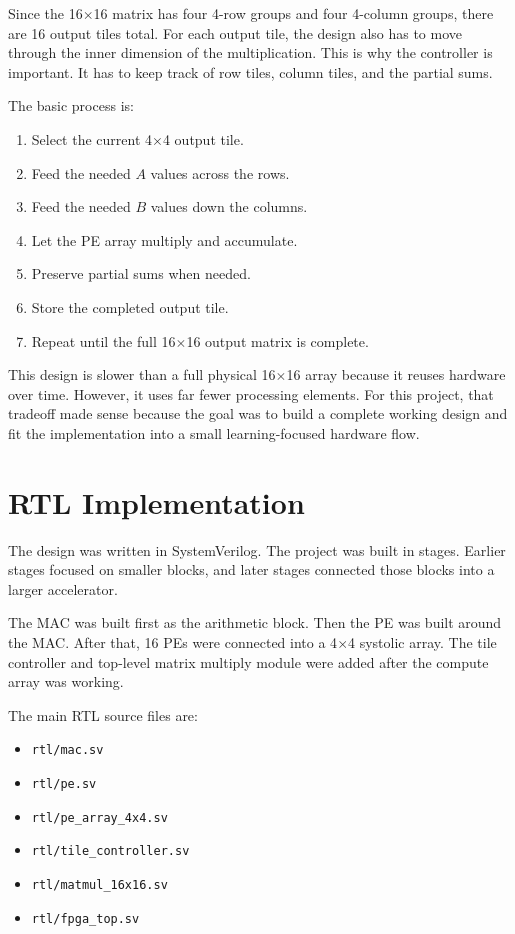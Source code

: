\documentclass[conference]{IEEEtran}
\begin{document}
Since the 16$\times$16 matrix has four 4-row groups and four 4-column groups, there are 16 output tiles total. For each output tile, the design also has to move through the inner dimension of the multiplication. This is why the controller is important. It has to keep track of row tiles, column tiles, and the partial sums.

The basic process is:

\begin{enumerate}
\item Select the current 4$\times$4 output tile.
\item Feed the needed $A$ values across the rows.
\item Feed the needed $B$ values down the columns.
\item Let the PE array multiply and accumulate.
\item Preserve partial sums when needed.
\item Store the completed output tile.
\item Repeat until the full 16$\times$16 output matrix is complete.
\end{enumerate}

This design is slower than a full physical 16$\times$16 array because it reuses hardware over time. However, it uses far fewer processing elements. For this project, that tradeoff made sense because the goal was to build a complete working design and fit the implementation into a small learning-focused hardware flow.

\section{RTL Implementation}

The design was written in SystemVerilog. The project was built in stages. Earlier stages focused on smaller blocks, and later stages connected those blocks into a larger accelerator.

The MAC was built first as the arithmetic block. Then the PE was built around the MAC. After that, 16 PEs were connected into a 4$\times$4 systolic array. The tile controller and top-level matrix multiply module were added after the compute array was working.

The main RTL source files are:

\begin{itemize}
\item \texttt{rtl/mac.sv}
\item \texttt{rtl/pe.sv}
\item \texttt{rtl/pe\_array\_4x4.sv}
\item \texttt{rtl/tile\_controller.sv}
\item \texttt{rtl/matmul\_16x16.sv}
\item \texttt{rtl/fpga\_top.sv}
\end{itemize}
\end{document}
